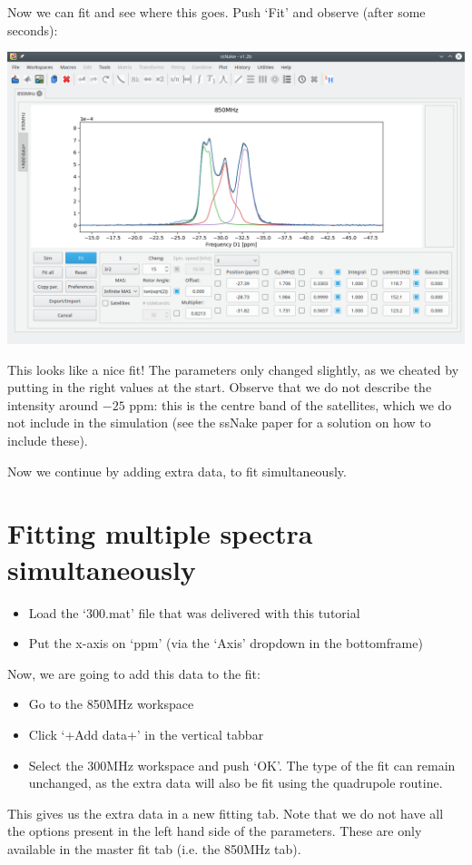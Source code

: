 \documentclass[11pt,a4paper]{article}
\begin{document}
Now we can fit and see where this goes. Push `Fit' and observe (after some seconds):
\begin{center}
\includegraphics[width=1.0\linewidth]{Figs/Fig7.png}
\end{center}
This looks like a nice fit! The parameters only changed slightly, as we cheated by putting in the
right values at the start. Observe that we do not describe the intensity around $-25$ ppm: this is
the centre band of the satellites, which we do not include in the simulation (see the ssNake paper
for a solution on how to include these).

Now we continue by adding extra data, to fit simultaneously.

\section{Fitting multiple spectra simultaneously}
\begin{itemize}
  \item Load the `300.mat' file that was delivered with this tutorial
  \item Put the x-axis on `ppm' (via the `Axis' dropdown in the bottomframe)
\end{itemize}

Now, we are going to add this data to the fit:
\begin{itemize}
  \item Go to the 850MHz workspace
  \item Click `+Add data+' in the vertical tabbar
  \item Select the 300MHz workspace and push `OK'. The type of the fit can remain unchanged, as the extra data will also be fit using the quadrupole routine.
\end{itemize}
This gives us the extra data in a new fitting tab. Note that we do not have all the options present
in the left hand side of the parameters. These are only available in the master fit tab (i.e. the
850MHz tab). 
\end{document}
